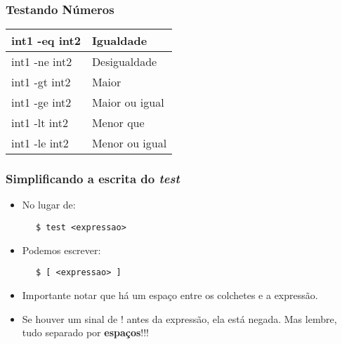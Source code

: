 \documentclass{beamer}
\begin{document}
   \begin{frame}
      \frametitle{Testando Números}
      \begin{table}
         \begin{tabular}{l|l}
	 \hline
         int1 -eq int2 & Igualdade \\
         \hline 
         int1 -ne int2 & Desigualdade \\
         \hline 
         int1 -gt int2 & Maior \\
         \hline 
         int1 -ge int2 & Maior ou igual \\
         \hline 
         int1 -lt int2 & Menor que \\
         \hline 
         int1 -le int2 & Menor ou igual \\
         \hline 
         \end{tabular}
      \end{table}
   \end{frame}

   \begin{frame}[fragile]
      \frametitle{Simplificando a escrita do \textit{test}}
      \begin{itemize}
         \item No lugar de: 
      \end{itemize}
      
      \begin{verbatim}
      $ test <expressao>
      \end{verbatim}

      \begin{itemize}
         \item Podemos escrever:
      \end{itemize}

      \begin{verbatim}
      $ [ <expressao> ]
      \end{verbatim}
      \begin{itemize}
         \item Importante notar que há um espaço entre os colchetes e a expressão.
         \item Se houver um sinal de ! antes da expressão, ela está negada. Mas lembre, tudo separado por \textbf{espaços}!!!
      \end{itemize}
\end{frame}
\end{document}
